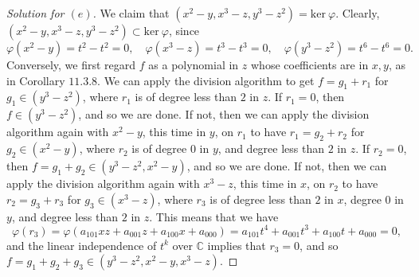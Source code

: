 \documentclass[12pt]{article}
\theoremstyle{remark}
\begin{document}
\begin{proof}[Solution for $(e)$]
  We claim that $(x^2-y,x^3-z,y^3-z^2) = \mathrm{ker}~\varphi$. Clearly, $(x^2-y,x^3-z,y^3-z^2) \subset \mathrm{ker}~\varphi$, since
  \begin{equation*}
    \varphi(x^2-y) = t^2-t^2 = 0, \quad \varphi(x^3-z) = t^3-t^3 = 0, \quad \varphi(y^3-z^2) = t^6-t^6 = 0.
  \end{equation*}
  Conversely, we first regard $f$ as a polynomial in $z$ whose coefficients are in $x,y$, as in Corollary $11.3.8$. We can apply the division algorithm to get $f = g_1 + r_1$ for $g_1 \in (y^3-z^2)$, where $r_1$ is of degree less than $2$ in $z$. If $r_1 = 0$, then $f \in (y^3-z^2)$, and so we are done. If not, then we can apply the division algorithm again with $x^2-y$, this time in $y$, on $r_1$ to have $r_1 = g_2 + r_2$ for $g_2 \in (x^2-y)$, where $r_2$ is of degree $0$ in $y$, and degree less than $2$ in $z$. If $r_2 = 0$, then $f = g_1 + g_2 \in (y^3-z^2,x^2-y)$, and so we are done. If not, then we can apply the division algorithm again with $x^3-z$, this time in $x$, on $r_2$ to have $r_2 = g_3 + r_3$ for $g_3 \in (x^3-z)$, where $r_3$ is of degree less than $2$ in $x$, degree $0$ in $y$, and degree less than $2$ in $z$. This means that we have
  \begin{equation*}
    \varphi(r_3) = \varphi(a_{101}xz + a_{001}z + a_{100}x + a_{000}) = a_{101}t^4 + a_{001}t^3 + a_{100}t + a_{000} = 0,
  \end{equation*}
  and the linear independence of $t^k$ over $\mathbb{C}$ implies that $r_3 = 0$, and so $f = g_1 + g_2 + g_3 \in (y^3-z^2,x^2-y,x^3-z)$.
\end{proof}
\end{document}
